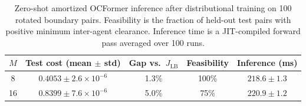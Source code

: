 \begin{table}[htbp]
  \centering
  \caption{Zero-shot amortized OCFormer inference after distributional training on 100 rotated boundary pairs. Feasibility is the fraction of held-out test pairs with positive minimum inter-agent clearance. Inference time is a JIT-compiled forward pass averaged over 100 runs.}
  \label{tab:oc:amortized}
  \begin{tabular}{@{}ccccc@{}}
    \toprule
    $M$ & Test cost (mean $\pm$ std) & Gap vs.\ $J_{\text{LB}}$ & Feasibility & Inference (ms) \\
    \midrule
    8  & $0.4053 \pm 2.6\times 10^{-6}$ & 1.3\% & 100\% & $218.6 \pm 1.3$ \\
    16 & $0.8399 \pm 7.6\times 10^{-6}$ & 5.0\% & 75\%  & $220.9 \pm 1.2$ \\
    \bottomrule
  \end{tabular}
\end{table}
